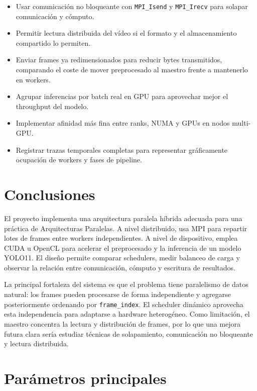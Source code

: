 \documentclass[12pt,a4paper]{article}
\begin{document}
\begin{itemize}
    \item Usar comunicaci\'on no bloqueante con \texttt{MPI\_Isend} y \texttt{MPI\_Irecv} para
    solapar comunicaci\'on y c\'omputo.
    \item Permitir lectura distribuida del v\'ideo si el formato y el almacenamiento compartido
    lo permiten.
    \item Enviar frames ya redimensionados para reducir bytes transmitidos, comparando el coste
    de mover preprocesado al maestro frente a mantenerlo en workers.
    \item Agrupar inferencias por batch real en GPU para aprovechar mejor el throughput del
    modelo.
    \item Implementar afinidad m\'as fina entre ranks, NUMA y GPUs en nodos multi-GPU.
    \item Registrar trazas temporales completas para representar gr\'aficamente ocupaci\'on de
    workers y fases de pipeline.
\end{itemize}

\section{Conclusiones}

El proyecto implementa una arquitectura paralela h\'ibrida adecuada para una pr\'actica de
Arquitecturas Paralelas. A nivel distribuido, usa MPI para repartir lotes de frames entre
workers independientes. A nivel de dispositivo, emplea CUDA u OpenCL para acelerar el
preprocesado y la inferencia de un modelo YOLO11. El dise\~no permite comparar schedulers,
medir balanceo de carga y observar la relaci\'on entre comunicaci\'on, c\'omputo y escritura de
resultados.

La principal fortaleza del sistema es que el problema tiene paralelismo de datos natural: los
frames pueden procesarse de forma independiente y agregarse posteriormente ordenando por
\texttt{frame\_index}. El scheduler din\'amico aprovecha esta independencia para adaptarse a
hardware heterog\'eneo. Como limitaci\'on, el maestro concentra la lectura y distribuci\'on de
frames, por lo que una mejora futura clara ser\'ia estudiar t\'ecnicas de solapamiento,
comunicaci\'on no bloqueante y lectura distribuida.

\appendix
\section{Par\'ametros principales}
\end{document}
